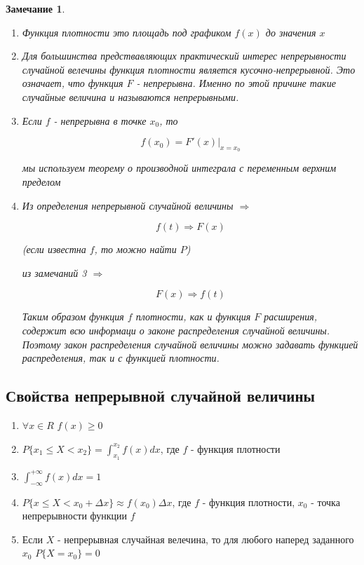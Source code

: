\documentclass[a4paper, 14pt]{report}
\newtheorem{note}{Замечание}[section]
\begin{document}
\begin{note}
    \begin{enumerate}
        \item Функция плотности это площадь под графиком $f(x)$ до значения $x$
        \item Для большинства предствавляющих практический интерес непрерывности случайной велечины функция плотности является кусочно-непрерывной. Это означает, что функция $F$ - непрерывна. Именно по этой причине такие случайные величина и называются непрерывными.
        \item Если $f$ - непрерывна в точке $x_0$, то 

            $$
            f(x_0) = F'(x) |_{x=x_0}
            $$

            мы используем теорему о производной интеграла с переменным верхним пределом

        \item Из определения непрерывной случайной величины $\Rightarrow$

            $$
            f(t) \Rightarrow F(x)
            $$

            (если известна $f$, то можно найти $P$)

            из замечаний 3 $\Rightarrow$ 

            $$
            F(x) \Rightarrow f(t)
            $$

            Таким образом функция $f$ плотности, как и функция $F$ расширения, содержит всю информаци о законе распределения случайной величины. Поэтому закон распределения случайной величины можно задавать функцией распределения, так и с функцией плотности.
    \end{enumerate}
\end{note}

\subsection{Свойства непрерывной случайной величины}

\begin{enumerate}
    \item $\forall x \in R$ $f(x) \geq 0$
    \item $P\{x_1 \le X < x_2 \} = \int_{x_1}^{x_2} f(x) dx$, где $f$ - функция плотности
    \item $\int_{-\infty}^{+\infty} f(x)dx = 1$
    \item $P\{x \le X < x_0 + \Delta x\} \approx f(x_0) \Delta x$, где $f$ - функция плотности, $x_0$ - точка непрерывности функции $f$
    \item Если $X$ - непрерывная случайная велечина, то для любого наперед заданного $x_0$
        $P\{X = x_0\} = 0$
\end{enumerate}
\end{document}
